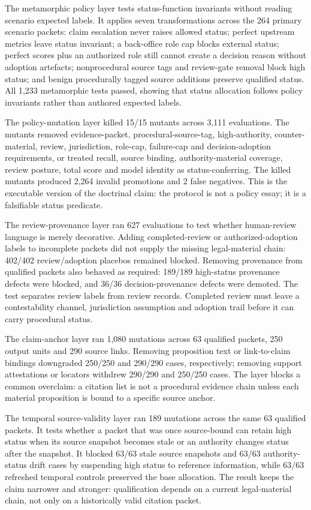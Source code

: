 \documentclass[12pt,a4paper]{article}
\begin{document}
The metamorphic policy layer tests status-function invariants without reading scenario expected labels. It applies seven transformations across the 264 primary scenario packets: claim escalation never raises allowed status; perfect upstream metrics leave status invariant; a back-office role cap blocks external status; perfect scores plus an authorized role still cannot create a decision reason without adoption artefacts; nonprocedural source tags and review-gate removal block high status; and benign procedurally tagged source additions preserve qualified status. All 1,233 metamorphic tests passed, showing that status allocation follows policy invariants rather than authored expected labels.

The policy-mutation layer killed 15/15 mutants across 3,111 evaluations. The mutants removed evidence-packet, procedural-source-tag, high-authority, counter-material, review, jurisdiction, role-cap, failure-cap and decision-adoption requirements, or treated recall, source binding, authority-material coverage, review posture, total score and model identity as status-conferring. The killed mutants produced 2,264 invalid promotions and 2 false negatives. This is the executable version of the doctrinal claim: the protocol is not a policy essay; it is a falsifiable status predicate.

The review-provenance layer ran 627 evaluations to test whether human-review language is merely decorative. Adding completed-review or authorized-adoption labels to incomplete packets did not supply the missing legal-material chain: 402/402 review/adoption placebos remained blocked. Removing provenance from qualified packets also behaved as required: 189/189 high-status provenance defects were blocked, and 36/36 decision-provenance defects were demoted. The test separates review labels from review records. Completed review must leave a contestability channel, jurisdiction assumption and adoption trail before it can carry procedural status.

The claim-anchor layer ran 1,080 mutations across 63 qualified packets, 250 output units and 290 source links. Removing proposition text or link-to-claim bindings downgraded 250/250 and 290/290 cases, respectively; removing support attestations or locators withdrew 290/290 and 250/250 cases. The layer blocks a common overclaim: a citation list is not a procedural evidence chain unless each material proposition is bound to a specific source anchor.

The temporal source-validity layer ran 189 mutations across the same 63 qualified packets. It tests whether a packet that was once source-bound can retain high status when its source snapshot becomes stale or an authority changes status after the snapshot. It blocked 63/63 stale source snapshots and 63/63 authority-status drift cases by suspending high status to reference information, while 63/63 refreshed temporal controls preserved the base allocation. The result keeps the claim narrower and stronger: qualification depends on a current legal-material chain, not only on a historically valid citation packet.
\end{document}
